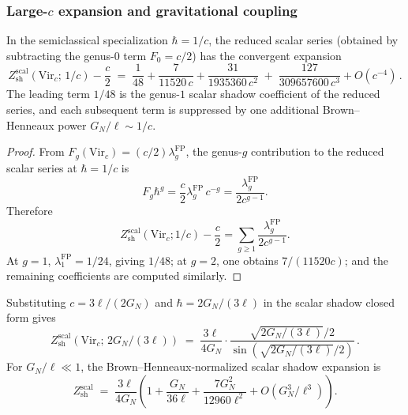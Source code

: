 \subsubsection{Large-$c$ expansion and gravitational coupling}

\begin{proposition}
In the semiclassical specialization $\hbar = 1/c$, the reduced scalar
series \textup{(}obtained by subtracting the genus-$0$ term
$F_0=c/2$\textup{)} has the convergent expansion
\begin{equation}%
Z_{\mathrm{sh}}^{\mathrm{scal}}(\mathrm{Vir}_c;\,1/c) - \frac{c}{2}
\;=\;
\frac{1}{48} + \frac{7}{11520\,c} + \frac{31}{1935360\,c^2}
\;+\; \frac{127}{309657600\,c^3} + O(c^{-4})\,.
\end{equation}
The leading term $1/48$ is the genus-$1$ scalar shadow coefficient of
the reduced series, and each subsequent term is suppressed by one
additional Brown--Henneaux power $G_N/\ell \sim 1/c$.
\end{proposition}

\begin{proof}
From $F_g(\mathrm{Vir}_c) = (c/2)\lambda_g^{\mathrm{FP}}$, the
genus-$g$ contribution to the reduced scalar series at $\hbar = 1/c$ is
\[
F_g \hbar^g = \frac{c}{2}\lambda_g^{\mathrm{FP}}\,c^{-g}
= \frac{\lambda_g^{\mathrm{FP}}}{2c^{g-1}}.
\]
Therefore
\[
Z_{\mathrm{sh}}^{\mathrm{scal}}(\mathrm{Vir}_c;1/c) - \frac{c}{2}
= \sum_{g \geq 1} \frac{\lambda_g^{\mathrm{FP}}}{2c^{g-1}}.
\]
At $g = 1$, $\lambda_1^{\mathrm{FP}} = 1/24$, giving $1/48$; at
$g = 2$, one obtains $7/(11520c)$; and the remaining coefficients are
computed similarly.
\end{proof}

\begin{proposition}
Substituting $c = 3\ell/(2G_N)$ and $\hbar = 2G_N/(3\ell)$ in the scalar
shadow closed form gives
\begin{equation}%
Z_{\mathrm{sh}}^{\mathrm{scal}}(\mathrm{Vir}_c;\,2G_N/(3\ell)) \;=\; \frac{3\ell}{4G_N} \cdot \frac{\sqrt{2G_N/(3\ell)}/2}{\sin(\sqrt{2G_N/(3\ell)}/2)}\,.
\end{equation}
For $G_N/\ell \ll 1$, the Brown--Henneaux-normalized scalar shadow
expansion is
\begin{equation}%
Z_{\mathrm{sh}}^{\mathrm{scal}}
\;=\; \frac{3\ell}{4G_N}\left(1 + \frac{G_N}{36\ell} + \frac{7G_N^2}{12960\ell^2} + O(G_N^3/\ell^3)\right).
\end{equation}
\end{proposition}

